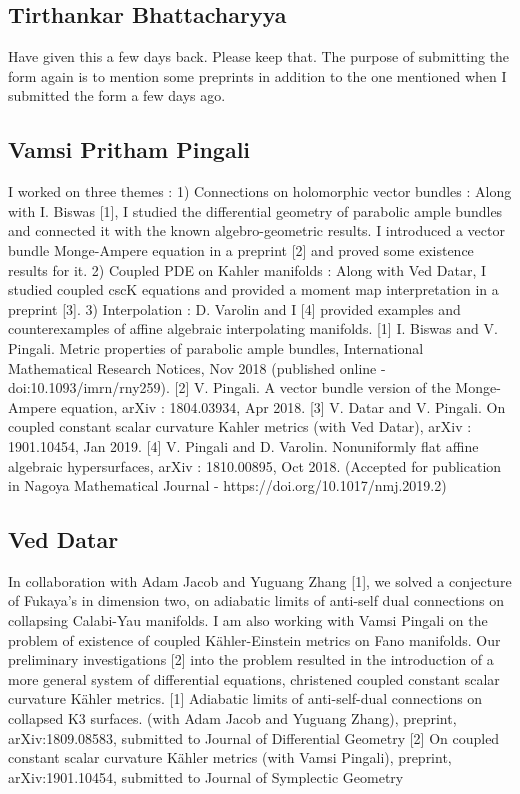 \subsection{Tirthankar Bhattacharyya}

Have given this a few days back. Please keep that. The purpose of submitting the form again is to mention some preprints in addition to the one mentioned when I submitted the form a few days ago.


\subsection{Vamsi Pritham Pingali}

I worked on three themes : 1) Connections on holomorphic vector bundles : Along with I. Biswas [1], I studied the differential geometry of parabolic ample bundles and connected it with the known algebro-geometric results.  I introduced a vector bundle Monge-Ampere equation in a preprint [2] and proved some existence results for it. 2) Coupled PDE on Kahler manifolds : Along with Ved Datar, I studied coupled cscK equations and provided a moment map interpretation in a preprint [3]. 3) Interpolation : D. Varolin and I [4] provided examples and counterexamples of affine algebraic interpolating manifolds.  [1] I. Biswas and V. Pingali. Metric properties of parabolic ample bundles, International Mathematical Research Notices, Nov 2018 (published online - doi:10.1093/imrn/rny259). [2] V. Pingali. A vector bundle version of the Monge-Ampere equation, arXiv : 1804.03934, Apr 2018. [3] V. Datar and V. Pingali. On coupled constant scalar curvature Kahler metrics (with Ved Datar), arXiv : 1901.10454, Jan 2019. [4] V. Pingali and D. Varolin. Nonuniformly flat affine algebraic hypersurfaces, arXiv : 1810.00895, Oct 2018. (Accepted for publication in Nagoya Mathematical Journal -  https://doi.org/10.1017/nmj.2019.2)


\subsection{Ved Datar}

In collaboration with Adam Jacob and Yuguang Zhang [1], we solved a conjecture of Fukaya's in dimension two, on adiabatic limits of anti-self dual connections on collapsing Calabi-Yau manifolds.   I am also working with Vamsi Pingali on the problem of existence of coupled K\"ahler-Einstein metrics on Fano manifolds. Our preliminary investigations [2] into the problem resulted in the introduction of a more general system of differential equations, christened coupled constant scalar curvature K\"ahler metrics.    [1] Adiabatic limits of anti-self-dual connections on collapsed K3 surfaces. (with Adam Jacob and Yuguang Zhang), preprint,  arXiv:1809.08583, submitted to Journal of Differential Geometry [2]  On coupled constant scalar curvature Kähler metrics (with Vamsi Pingali), preprint,  arXiv:1901.10454, submitted to Journal of Symplectic Geometry  